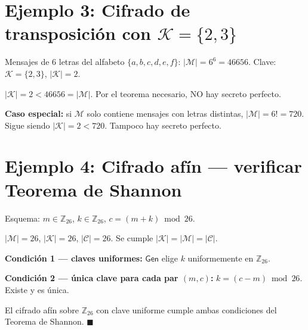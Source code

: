 \documentclass[11pt,a4paper]{article}
\begin{document}
\section{Ejemplo 3: Cifrado de transposición con $\mathcal{K}=\{2,3\}$}

\begin{tcolorbox}[examplestyle, title={Ejemplo 3: Transposición sobre alfabeto de 6 letras}]
Mensajes de 6 letras del alfabeto $\{a,b,c,d,e,f\}$:
$|\mathcal{M}| = 6^6 = 46656$. \quad Clave: $\mathcal{K} = \{2, 3\}$, $|\mathcal{K}| = 2$.
\end{tcolorbox}

\begin{tcolorbox}[nostyle, title={Conclusi\'on --- NO hay secreto perfecto}]
$|\mathcal{K}| = 2 < 46656 = |\mathcal{M}|$. Por el teorema necesario, NO hay secreto perfecto.

\smallskip
\textbf{Caso especial:} si $\mathcal{M}$ solo contiene mensajes con letras distintas,
$|\mathcal{M}| = 6! = 720$. Sigue siendo $|\mathcal{K}| = 2 < 720$. Tampoco hay secreto perfecto.
\end{tcolorbox}

\section{Ejemplo 4: Cifrado af\'in --- verificar Teorema de Shannon}

\begin{tcolorbox}[examplestyle, title={Ejemplo 4: Cifrado afín sobre $\mathbb{Z}_{26}$}]
Esquema: $m \in \mathbb{Z}_{26}$, $k \in \mathbb{Z}_{26}$, $c = (m + k) \bmod 26$.

\smallskip
$|\mathcal{M}| = 26$, $|\mathcal{K}| = 26$, $|\mathcal{C}| = 26$.
Se cumple $|\mathcal{K}| = |\mathcal{M}| = |\mathcal{C}|$.

\medskip
\textbf{Condici\'on 1 --- claves uniformes:}
$\mathsf{Gen}$ elige $k$ uniformemente en $\mathbb{Z}_{26}$. \checkmark

\medskip
\textbf{Condici\'on 2 --- \'unica clave para cada par $(m,c)$:}
$k = (c - m) \bmod 26$. Existe y es única. \checkmark
\end{tcolorbox}

\begin{tcolorbox}[yestyle, title={Conclusi\'on --- S\'I hay secreto perfecto}]
El cifrado af\'in sobre $\mathbb{Z}_{26}$ con clave uniforme cumple ambas condiciones
del Teorema de Shannon. $\blacksquare$
\end{tcolorbox}
\end{document}
